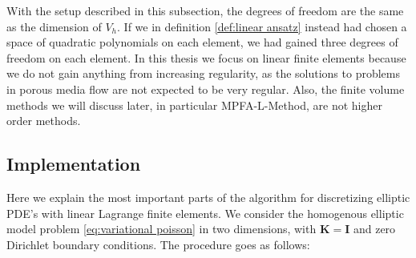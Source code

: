 \documentclass[../Main/main.tex]{subfiles}
\begin{document}
	With the setup described in this subsection, the degrees of freedom are the same as the dimension of $V_h$. If we in definition \ref{def:linear ansatz} instead had chosen a space of quadratic polynomials on each element, we had gained three degrees of freedom on each element. In this thesis we focus on linear finite elements because we do not gain anything from increasing regularity, as the solutions to problems in porous media flow are not expected to be very regular. Also, the finite volume methods we will discuss later, in particular MPFA-L-Method, are not higher order methods. 
	\subsection{Implementation}

	Here we explain the most important parts of the algorithm for discretizing elliptic PDE's with linear Lagrange finite elements. We consider the homogenous elliptic model problem \eqref{eq:variational poisson} in two dimensions, with $\bm{K} = \bm{I}$ and zero Dirichlet boundary conditions. The procedure goes as follows:
\end{document}
